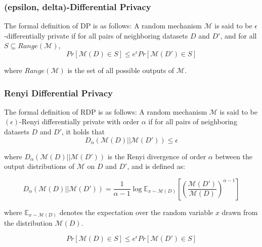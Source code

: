 \subsubsection{(epsilon, delta)-Differential Privacy}
\label{sec:eddp}

The formal definition of DP is as follows:
A random mechanism $\mathcal{M}$ is said to be $\epsilon$-differentially private if for all pairs of neighboring datasets $D$ and $D'$, and for all $S \subseteq Range(\mathcal{M})$,
\begin{equation}
    Pr[\mathcal{M}(D) \in S] \leq e^{\epsilon} Pr[\mathcal{M}(D') \in S]
\end{equation}
    
    where $Range(\mathcal{M})$ is the set of all possible outputs of $\mathcal{M}$.


\subsubsection{Renyi Differential Privacy}
\label{sec:rdp}

The formal definition of RDP is as follows:
A random mechanism $\mathcal{M}$ is said to be $(\epsilon)$-Renyi differentially private with order $\alpha$ if for all pairs of neighboring datasets $D$ and $D'$, it holds that
\begin{equation}
    D_{\alpha}(\mathcal{M}(D) || \mathcal{M}(D')) \leq \epsilon
\end{equation}
    
    where $D_{\alpha}(\mathcal{M}(D) || \mathcal{M}(D'))$ is the Renyi divergence of order $\alpha$ between the output distributions of $\mathcal{M}$ on $D$ and $D'$, and is defined as:
    
    \begin{equation}
        D_{\alpha}(\mathcal{M}(D) || \mathcal{M}(D')) = \frac{1}{\alpha - 1} \log \mathbb{E}_{x \sim \mathcal{M}(D)} \left[ \left( \frac{\mathcal{M}(D')}{\mathcal{M}(D)} \right)^{\alpha - 1} \right]
    \end{equation}
        
        where $\mathbb{E}_{x \sim \mathcal{M}(D)}$ denotes the expectation over the random variable $x$ drawn from the distribution $\mathcal{M}(D)$.

        

    
\begin{equation}
    Pr[\mathcal{M}(D) \in S] \leq e^{\epsilon} Pr[\mathcal{M}(D') \in S]
\end{equation}
    
